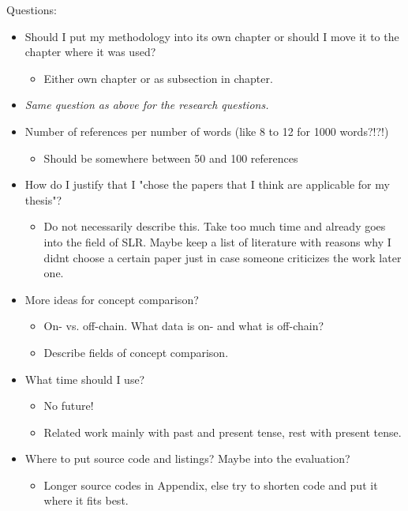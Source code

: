 Questions:
\begin{itemize}
    \item Should I put my methodology into its own chapter or should I move it to the chapter where it was used?
    \begin{itemize}
        \item Either own chapter or as subsection in chapter.
    \end{itemize}
    \item \textit{Same question as above for the research questions.}
    \item Number of references per number of words (like 8 to 12 for 1000 words?!?!)
    \begin{itemize}
        \item Should be somewhere between 50 and 100 references
    \end{itemize}
    \item How do I justify that I "chose the papers that I think are applicable for my thesis"?
    \begin{itemize}
        \item Do not necessarily describe this. Take too much time and already goes into the field of SLR. Maybe keep a list of literature with reasons why I didnt choose a certain paper just in case someone criticizes the work later one.
    \end{itemize}
    \item More ideas for concept comparison?
    \begin{itemize}
        \item On- vs. off-chain. What data is on- and what is off-chain?
        \item Describe fields of concept comparison.
    \end{itemize}
    \item What time should I use?
    \begin{itemize}
        \item No future!
        \item Related work mainly with past and present tense, rest with present tense.
    \end{itemize}
    \item Where to put source code and listings? Maybe into the evaluation?
    \begin{itemize}
        \item Longer source codes in Appendix, else try to shorten code and put it where it fits best.
    \end{itemize}
\end{itemize}


